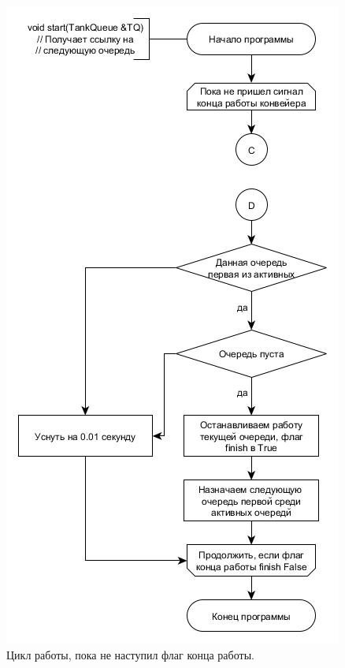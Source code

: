 \documentclass[a4paper, 14pt]{article}
\begin{document}
    \begin{figure}[h!]
    \center
    \includegraphics[scale=0.65]{start_part1.jpg}
    \caption{Цикл работы, пока не наступил флаг конца работы.}
    \label{ris:start1}
    \end{figure}\newpage
    
\end{document}
